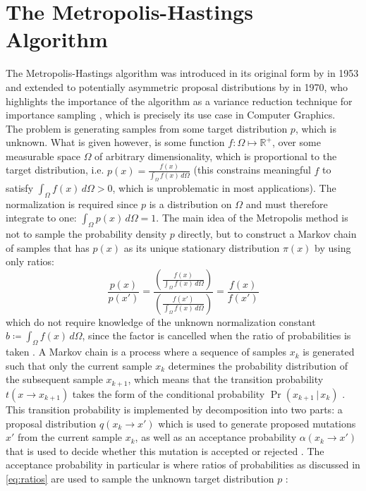 \documentclass[oneside, a4paper]{article}
\newcommand\br[1]{\left(#1\right)}
\begin{document}
\section{The Metropolis-Hastings Algorithm}
The Metropolis-Hastings algorithm was introduced in its original form by \autocite[Metropolis, Rosenbluth, Rosenbluth and Teller]{metropolis-original-fast-computing} in 1953 and extended to potentially asymmetric proposal distributions by \autocite[Hastings]{hastings} in 1970, who highlights the importance of the algorithm as a variance reduction technique for importance sampling \autocite{hastings}, which is precisely its use case in Computer Graphics.\\


The problem is generating samples from some target distribution $p$, which is unknown. What is given however, is some function $f: \Omega \mapsto \mathds{R}^+$, over some measurable space $\Omega$ of arbitrary dimensionality, which is proportional to the target distribution, i.e. $p(x) = \frac{f(x)}{\int_{\Omega} f(x)\,d\Omega}$ (this constrains meaningful $f$ to satisfy $\int_{\Omega} f(x)\,d\Omega > 0$, which is unproblematic in most applications). The normalization is required since $p$ is a distribution on $\Omega$ and must therefore integrate to one: $\int_{\Omega} p(x)\,d\Omega = 1$. The main idea of the Metropolis method is not to sample the probability density $p$ directly, but to construct a Markov chain of samples that has $p(x)$ as its unique stationary distribution $\pi(x)$ by using only ratios:
\begin{equation}\label{eq:ratios}
  \frac{p(x)}{p(x')} = \frac{\br{\frac{f(x)}{\int_{\Omega} f(x)\,d\Omega}}}{\br{\frac{f(x')}{\int_{\Omega} f(x)\,d\Omega}}} = \frac{f(x)}{f(x')}
\end{equation}
which do not require knowledge of the unknown normalization constant $b \coloneq \int_{\Omega} f(x)\,d\Omega$, since the factor is cancelled when the ratio of probabilities is taken \autocites{hastings}{pbrt}. A Markov chain is a process where a sequence of samples $x_k$ is generated such that only the current sample $x_{k}$ determines the probability distribution of the subsequent sample $x_{k+1}$, which means that the transition probability $t(x \to x_{k+1})$ takes the form of the conditional probability $\Pr\br{x_{k+1} \,|\, x_k}$ \autocites{hastings}{survey}. This transition probability is implemented by decomposition into two parts: a proposal distribution $q(x_k \to x')$ which is used to generate proposed mutations $x'$ from the current sample $x_k$, as well as an acceptance probability $\alpha\br{x_k \to x'}$ that is used to decide whether this mutation is accepted or rejected \autocite{survey}. The acceptance probability in particular is where ratios of probabilities as discussed in \autoref{eq:ratios} are used to sample the unknown target distribution $p$ \autocite{survey}:
\end{document}
